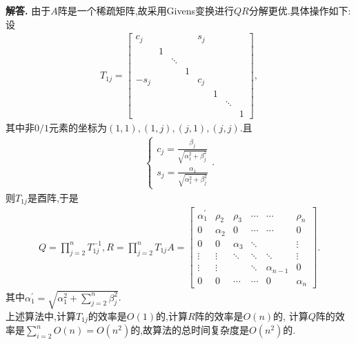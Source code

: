 \documentclass[12pt, a4paper, oneside, UTF8]{ctexart}
\newenvironment{solution}{\par\noindent\textbf{解答. }}{\par}
\begin{document}
\begin{solution}
    由于$A$阵是一个稀疏矩阵,故采用Givens变换进行$QR$分解更优.具体操作如下:\\
    设
    \begin{align*}
        T_{1j}=
        \left[
            \begin{array}{cccccccc}	
                c_j &   &   &   & s_j\\
                  & 1 \\
                  &   & \ddots \\
                  &   &   & 1 \\
                -s_j &   &   &   & c_j \\
                  &   &   &   &   & 1 \\
                  &   &   &   &   &   & \ddots \\
                  &   &   &   &   &   &    &  1
            \end{array}
        \right],
    \end{align*}
    其中非$0/1$元素的坐标为$(1,1),(1,j),(j,1),(j,j)$.且
    \begin{align*}
        \left\{
            \begin{array}{ll}
                c_j=\frac{{\beta}_{j}}{\sqrt{{\alpha}_{1}^{2}+{\beta}_{j}^{2}}} \\
                s_j=\frac{{\alpha}_{1}}{\sqrt{{\alpha}_{1}^{2}+{\beta}_{j}^{2}}}
            \end{array}.
        \right.
    \end{align*}
    则$T_{1j}$是酉阵,于是
    \begin{align*}
        Q=\prod_{j=2}^{n}{T_{1j}^{-1}},
        R=\prod_{j=2}^{n}{T_{1j}}{A}=
        \left[
            \begin{array}{cccccc}	
                {\alpha}_{1}^{'} & {\rho}_2 & {\rho}_3 & \cdots & \cdots & {\rho}_n \\
                0 & {\alpha}_2 & 0 & \cdots & \cdots & 0 \\
                0 & 0 & {\alpha}_3 & \ddots &   & \vdots \\
                \vdots & \vdots & \ddots & \ddots & \ddots & \vdots \\
                \vdots & \vdots &   & \ddots & {\alpha}_{n-1} & 0 \\
                0 & 0 & \cdots & \cdots & 0 & {\alpha}_n
            \end{array}
        \right].
    \end{align*}
    其中${\alpha}_{1}^{'}=\sqrt{{\alpha}_{1}^{2}+\sum\limits_{j=2}^{n}{{\beta}_{j}^{2}}}$.\\
    上述算法中,计算$T_{1j}$的效率是$O(1)$的,计算$R$阵的效率是$O(n)$的,
    计算$Q$阵的效率是$\sum\limits_{i=2}^{n}{O(n)}=O(n^2)$的,故算法的总时间复杂度是$O(n^2)$的.
\end{solution}
\end{document}
